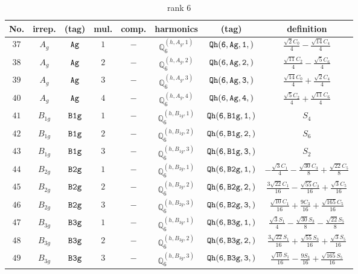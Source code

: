 \documentclass[fleqn,8pt]{jsarticle}
\begin{document}
\begin{table}[ht!]
\begin{center}
\caption{rank 6}
\renewcommand{\arraystretch}{1.3}
\begin{tabular}{cccccccc} \hline \hline
No. & irrep. & (tag) & mul. & comp. & harmonics & (tag) & definition \\ \hline
$ 37 $ & $ A_{g} $ & $ {\tt Ag} $ & $ 1 $ & $ - $ & $ \mathbb{Q}_{6}^{(h,A_{g},1)} $ & $ {\tt Qh(6,Ag,1,)} $ & $ \frac{\sqrt{2} C_{0}}{4} - \frac{\sqrt{14} C_{4}}{4} $ \\
$ 38 $ & $ A_{g} $ & $ {\tt Ag} $ & $ 2 $ & $ - $ & $ \mathbb{Q}_{6}^{(h,A_{g},2)} $ & $ {\tt Qh(6,Ag,2,)} $ & $ \frac{\sqrt{11} C_{2}}{4} - \frac{\sqrt{5} C_{6}}{4} $ \\
$ 39 $ & $ A_{g} $ & $ {\tt Ag} $ & $ 3 $ & $ - $ & $ \mathbb{Q}_{6}^{(h,A_{g},3)} $ & $ {\tt Qh(6,Ag,3,)} $ & $ \frac{\sqrt{14} C_{0}}{4} + \frac{\sqrt{2} C_{4}}{4} $ \\
$ 40 $ & $ A_{g} $ & $ {\tt Ag} $ & $ 4 $ & $ - $ & $ \mathbb{Q}_{6}^{(h,A_{g},4)} $ & $ {\tt Qh(6,Ag,4,)} $ & $ \frac{\sqrt{5} C_{2}}{4} + \frac{\sqrt{11} C_{6}}{4} $ \\
$ 41 $ & $ B_{1g} $ & $ {\tt B1g} $ & $ 1 $ & $ - $ & $ \mathbb{Q}_{6}^{(h,B_{1g},1)} $ & $ {\tt Qh(6,B1g,1,)} $ & $ S_{4} $ \\
$ 42 $ & $ B_{1g} $ & $ {\tt B1g} $ & $ 2 $ & $ - $ & $ \mathbb{Q}_{6}^{(h,B_{1g},2)} $ & $ {\tt Qh(6,B1g,2,)} $ & $ S_{6} $ \\
$ 43 $ & $ B_{1g} $ & $ {\tt B1g} $ & $ 3 $ & $ - $ & $ \mathbb{Q}_{6}^{(h,B_{1g},3)} $ & $ {\tt Qh(6,B1g,3,)} $ & $ S_{2} $ \\
$ 44 $ & $ B_{2g} $ & $ {\tt B2g} $ & $ 1 $ & $ - $ & $ \mathbb{Q}_{6}^{(h,B_{2g},1)} $ & $ {\tt Qh(6,B2g,1,)} $ & $ - \frac{\sqrt{3} C_{1}}{4} - \frac{\sqrt{30} C_{3}}{8} + \frac{\sqrt{22} C_{5}}{8} $ \\
$ 45 $ & $ B_{2g} $ & $ {\tt B2g} $ & $ 2 $ & $ - $ & $ \mathbb{Q}_{6}^{(h,B_{2g},2)} $ & $ {\tt Qh(6,B2g,2,)} $ & $ \frac{3 \sqrt{22} C_{1}}{16} - \frac{\sqrt{55} C_{3}}{16} + \frac{\sqrt{3} C_{5}}{16} $ \\
$ 46 $ & $ B_{2g} $ & $ {\tt B2g} $ & $ 3 $ & $ - $ & $ \mathbb{Q}_{6}^{(h,B_{2g},3)} $ & $ {\tt Qh(6,B2g,3,)} $ & $ \frac{\sqrt{10} C_{1}}{16} + \frac{9 C_{3}}{16} + \frac{\sqrt{165} C_{5}}{16} $ \\
$ 47 $ & $ B_{3g} $ & $ {\tt B3g} $ & $ 1 $ & $ - $ & $ \mathbb{Q}_{6}^{(h,B_{3g},1)} $ & $ {\tt Qh(6,B3g,1,)} $ & $ \frac{\sqrt{3} S_{1}}{4} - \frac{\sqrt{30} S_{3}}{8} - \frac{\sqrt{22} S_{5}}{8} $ \\
$ 48 $ & $ B_{3g} $ & $ {\tt B3g} $ & $ 2 $ & $ - $ & $ \mathbb{Q}_{6}^{(h,B_{3g},2)} $ & $ {\tt Qh(6,B3g,2,)} $ & $ \frac{3 \sqrt{22} S_{1}}{16} + \frac{\sqrt{55} S_{3}}{16} + \frac{\sqrt{3} S_{5}}{16} $ \\
$ 49 $ & $ B_{3g} $ & $ {\tt B3g} $ & $ 3 $ & $ - $ & $ \mathbb{Q}_{6}^{(h,B_{3g},3)} $ & $ {\tt Qh(6,B3g,3,)} $ & $ \frac{\sqrt{10} S_{1}}{16} - \frac{9 S_{3}}{16} + \frac{\sqrt{165} S_{5}}{16} $ \\
 \hline \hline
\end{tabular}
\end{center}
\end{table}
\end{document}
